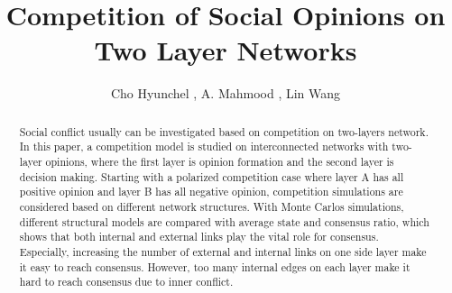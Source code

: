 \documentclass[english]{cccconf}
\begin{document}
\title{Competition of Social Opinions on Two Layer Networks}


\author{Cho Hyunchel ,
        A. Mahmood ,
        Lin Wang }

\maketitle

\begin{abstract}
Social conflict usually can be investigated based on competition on two-layers network. In this paper, a competition model is studied on interconnected networks with two-layer opinions, where the first layer is opinion formation and the second layer is decision making. Starting with a polarized competition case where layer A has all positive opinion and layer B has all negative opinion, competition simulations are considered based on different network structures. With Monte Carlos simulations, different structural models are compared with average state and consensus ratio, which shows that both internal and external links play the vital role for consensus. Especially, increasing the number of external and internal links on one side layer make it easy to reach consensus. However, too many internal edges on each layer make it hard to reach consensus due to inner conflict.
\end{abstract}


\end{document}
